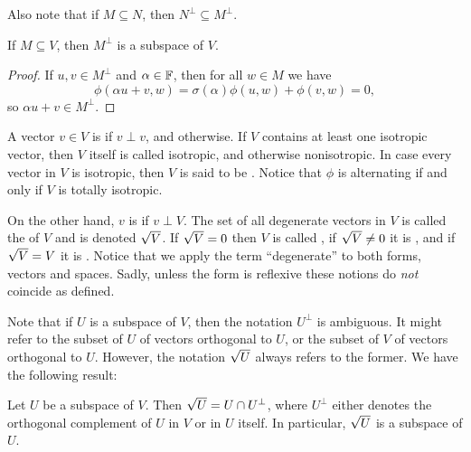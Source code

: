 Also note that if $M \subseteq N$, then $N^\perp \subseteq M^\perp$.

\begin{lemma}
    If $M \subseteq V$, then $M^\perp$ is a subspace of $V$.    
\end{lemma}

\begin{proof}
    If $u,v \in M^\perp$ and $\alpha \in \mathbb{F}$, then for all $w \in M$ we have
    \begin{equation*}
        \phi(\alpha u + v, w)
            = \sigma(\alpha) \phi(u,w) + \phi(v,w)
            = 0,
    \end{equation*}
    so $\alpha u + v \in M^\perp$.
\end{proof}


A vector $v \in V$ is  if $v \perp v$, and  otherwise. If $V$ contains at least one isotropic vector, then $V$ itself is called isotropic, and otherwise nonisotropic. In case every vector in $V$ is isotropic, then $V$ is said to be . Notice that $\phi$ is alternating if and only if $V$ is totally isotropic.

On the other hand, $v$ is  if $v \perp V$. The set of all degenerate vectors in $V$ is called the  of $V$ and is denoted $\sqrt{V}$. If $\sqrt{V} = 0$ then $V$ is called , if $\sqrt{V} \neq 0$ it is , and if $\sqrt{V} = V$ it is . Notice that we apply the term \enquote{degenerate} to both forms, vectors and spaces. Sadly, unless the form is reflexive these notions do \emph{not} coincide as defined. %

Note that if $U$ is a subspace of $V$, then the notation $U^\perp$ is ambiguous. It might refer to the subset of $U$ of vectors orthogonal to $U$, or the subset of $V$ of vectors orthogonal to $U$. However, the notation $\sqrt{U}$ always refers to the former. We have the following result:

\begin{lemmanoproof}
    Let $U$ be a subspace of $V$. Then $\sqrt{U} = U \cap U^\perp$, where $U^\perp$ either denotes the orthogonal complement of $U$ in $V$ or in $U$ itself. In particular, $\sqrt{U}$ is a subspace of $U$.
\end{lemmanoproof}




